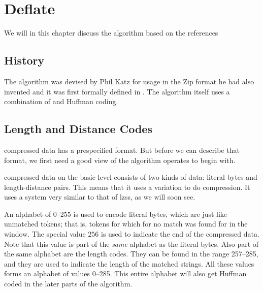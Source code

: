 \begin{comment}
  
\end{comment}

\chapter{Deflate}
\label{cha:deflate}

We will in this chapter discuss the  algorithm based on the
references
\cite{pkware:_appnot,deutsch96:_deflat_compr_data_format_specif,Salomon:2004:DCC,feldspar:_explan_deflat_algor}

\section{History}

The  algorithm was devised by Phil Katz for usage in the Zip
format he had also invented and it was first formally defined in
\cite{deutsch96:_deflat_compr_data_format_specif}. The algorithm
itself uses a combination of \lzone and Huffman coding.

\section{Length and Distance Codes}

 compressed data has a prespecified format. But before we can
describe that format, we first need a good view of the algorithm
operates to begin with.

 compressed data on the basic level consists of two kinds of
data: literal bytes and length-distance pairs. This means that it uses
a \lzone variation to do compression. It uses a system very similar to
that of lzss, as we will soon see.

An alphabet of 0--255 is used to encode literal bytes, which are just
like unmatched tokens; that is, tokens for which for no match was
found for in the \lzone window. The special value $256$ is used to
indicate the end of the compressed data. Note that this value is part
of the \textit{same} alphabet as the literal bytes. Also part of the
same alphabet are the length codes. They can be found in the range
257--285, and they are used to indicate the length of the \lzone matched
strings. All these values forms an alphabet of values 0--285. This
entire alphabet will also get Huffman coded in the later parts of the
algorithm.

